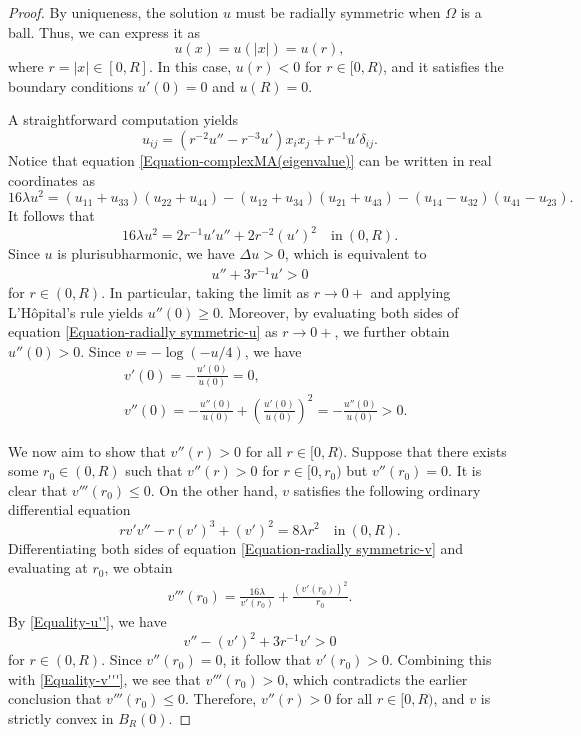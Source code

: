 \documentclass[11pt]{amsart}
\numberwithin{theorem}{section}
\numberwithin{equation}{section}
\begin{document}
\begin{proof}
By uniqueness, the solution $u$ must be radially symmetric when $\Omega$ is a ball. Thus, we can express it as $$u(x)=u(|x|)=u(r), $$ where $r=|x|\in[0,R]$. In this case, $u(r)<0$ for $r\in[0, R)$, and it satisfies the boundary conditions $u'(0)=0$ and $u(R)=0$.
 
A straightforward computation yields $$u_{ij}=\left(r^{-2}u''-r^{-3}u'\right)x_ix_j+r^{-1}u'\delta_{ij}. $$ Notice that equation \eqref{Equation-complexMA(eigenvalue)} can be written in real coordinates as $$16\lambda u^2=(u_{11}+u_{33})(u_{22}+u_{44})-(u_{12}+u_{34})(u_{21}+u_{43})-(u_{14}-u_{32})(u_{41}-u_{23}).$$ It follows that
\begin{equation}\label{Equation-radially symmetric-u}
16\lambda u^2=2r^{-1}u'u''+2r^{-2}(u')^2 \quad \mathrm{in} \ (0, R).
\end{equation}
Since $u$ is plurisubharmonic, we have $\Delta u>0$, which is equivalent to 
\begin{align}\label{Equality-u''}
u''+3r^{-1}u'>0
\end{align} 
for $r\in(0, R)$. In particular, taking the limit as $r\rightarrow0+$ and applying L'H{\^o}pital's rule yields $u''(0)\geq0$. Moreover, by evaluating both sides of equation \eqref{Equation-radially symmetric-u} as $r\rightarrow0+$, we further obtain $u''(0)>0$. Since $v=-\log(-u/4)$, we have 
\begin{align*}
&v'(0)=-\frac{u'(0)}{u(0)}=0, \\
&v''(0)=-\frac{u''(0)}{u(0)}+\left(\frac{u'(0)}{u(0)}\right)^2=-\frac{u''(0)}{u(0)}>0.
\end{align*}
 
We now aim to show that $v''(r)>0$ for all $r\in[0, R)$. Suppose that there exists some $r_0\in(0, R)$ such that $v''(r)>0$ for $r\in[0, r_0)$ but $v''(r_0)=0$. It is clear that $v'''(r_0)\leq0$. On the other hand, $v$ satisfies the following ordinary differential equation 
\begin{equation}\label{Equation-radially symmetric-v}
rv'v''-r(v')^3+(v')^2=8\lambda r^2\quad \mathrm{in} \ (0, R).
\end{equation} 
Differentiating both sides of equation \eqref{Equation-radially symmetric-v} and evaluating at $r_0$, we obtain 
\begin{align}\label{Equality-v'''}
v'''(r_0)=\frac{16\lambda}{v'(r_0)}+\frac{(v'(r_0))^2}{r_0}. 
\end{align} 
By \eqref{Equality-u''}, we have $$v''-(v')^2+3r^{-1}v'>0$$ for $r\in(0, R)$. Since $v''(r_0)=0$, it follow that $v'(r_0)>0$. Combining this with \eqref{Equality-v'''}, we see that $v'''(r_0)>0$, which contradicts the earlier conclusion that $v'''(r_0)\leq0$. Therefore, $v''(r)>0$ for all $r\in[0, R)$, and $v$ is strictly convex in $B_R(0)$.
\end{proof}
\end{document}
